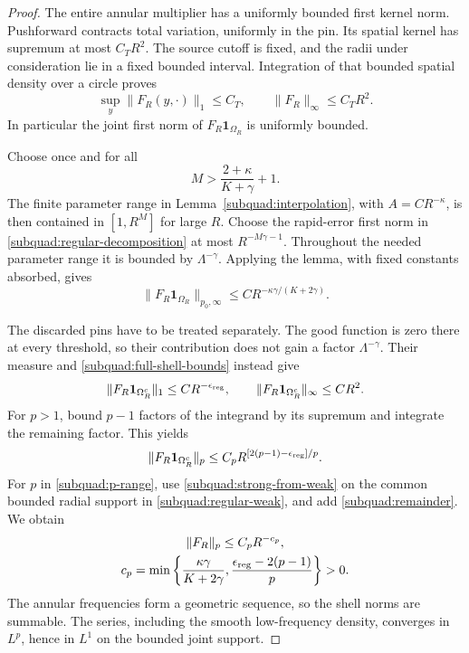 \begin{proof}
The entire annular multiplier has a uniformly bounded first kernel norm.
Pushforward contracts total variation, uniformly in the pin. Its spatial
kernel has supremum at most \(C_TR^2\). The source cutoff is fixed, and
the radii under consideration lie in a fixed bounded interval. Integration
of that bounded spatial density over a circle proves
\begin{equation}\label{subquad:full-shell-bounds}
 \sup_y\|F_R(y,\cdot)\|_1\le C_T,
 \qquad \|F_R\|_\infty\le C_TR^2.
\end{equation}
In particular the joint first norm of \(F_R\mathbf1_{\Omega_R}\) is
uniformly bounded.

Choose once and for all
\[
 M>\frac{2+\kappa}{K+\gamma}+1.
\]
The finite parameter range in Lemma~\ref{subquad:interpolation}, with
\(A=CR^{-\kappa}\), is then contained in \([1,R^M]\) for large \(R\).
Choose the rapid-error first norm in
\eqref{subquad:regular-decomposition} at most \(R^{-M\gamma-1}\).
Throughout the needed parameter range it is bounded by
\(\Lambda^{-\gamma}\). Applying the lemma, with fixed constants
absorbed, gives
\begin{equation}\label{subquad:regular-weak}
 \|F_R\mathbf1_{\Omega_R}\|_{p_0,\infty}
 \le CR^{-\kappa\gamma/(K+2\gamma)}.
\end{equation}

The discarded pins have to be treated separately. The good function is
zero there at every threshold, so their contribution does not gain a
factor \(\Lambda^{-\gamma}\). Their measure and
\eqref{subquad:full-shell-bounds} instead give
\[
 \|F_R\mathbf1_{\Omega_R^c}\|_1\le CR^{-\epsilon_{\rm reg}},
 \qquad
 \|F_R\mathbf1_{\Omega_R^c}\|_\infty\le CR^2.
\]
For \(p>1\), bound \(p-1\) factors of the integrand by its supremum
and integrate the remaining factor. This yields
\begin{equation}\label{subquad:remainder}
 \|F_R\mathbf1_{\Omega_R^c}\|_p
 \le C_pR^{[2(p-1)-\epsilon_{\rm reg}]/p}.
\end{equation}
For \(p\) in \eqref{subquad:p-range}, use
\eqref{subquad:strong-from-weak} on the common bounded radial support in
\eqref{subquad:regular-weak}, and add \eqref{subquad:remainder}. We obtain
\begin{gather}\label{subquad:shell-decay}
 \|F_R\|_p\le C_pR^{-c_p},\\
 c_p=\min\left\{\frac{\kappa\gamma}{K+2\gamma},
       \frac{\epsilon_{\rm reg}-2(p-1)}p\right\}>0.\nonumber
\end{gather}
The annular frequencies form a geometric sequence, so the shell norms
are summable. The series, including the smooth low-frequency density,
converges in \(L^p\), hence in \(L^1\) on the bounded joint support.


\end{proof}
